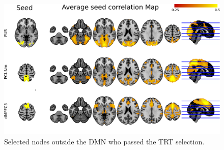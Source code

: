 \documentclass[authoryear]{elsarticle}
\begin{document}
\begin{figure}[H]
\begin{center}
\includegraphics[width=\linewidth]{../figures/fig_nodes_non_DMN.png}
\end{center}
\caption[Selected region outside DMN]{
	  Selected nodes outside the DMN who passed the TRT selection.
}
\label{fig_nodes_none_DMN}
\end{figure}
\end{document}
